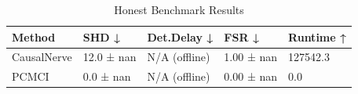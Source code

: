 \begin{table}
\caption{Honest Benchmark Results}
\label{tab:honest_results}
\begin{tabular}{lllll}
\toprule
Method & SHD ↓ & Det.Delay ↓ & FSR ↓ & Runtime ↑ \\
\midrule
CausalNerve & 12.0 ± nan & N/A (offline) & 1.00 ± nan & 127542.3 \\
PCMCI & 0.0 ± nan & N/A (offline) & 0.00 ± nan & 0.0 \\
\bottomrule
\end{tabular}
\end{table}
